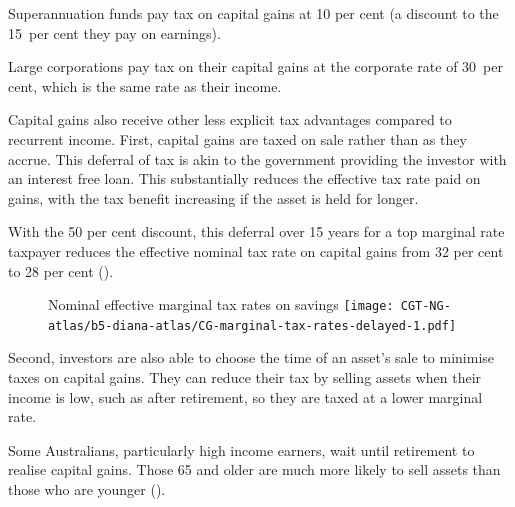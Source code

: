 Superannuation funds pay tax on capital gains at 10 per cent (a discount to the 15~per cent they pay on earnings). 

Large corporations pay tax on their capital gains at the corporate rate of 30~per cent, which is the same rate as their income.

Capital gains also receive other less explicit tax advantages compared to recurrent income. First, capital gains are taxed on sale rather than as they accrue. This deferral of tax is akin to the government providing the investor with an interest free loan.  This substantially reduces the effective tax rate paid on gains, with the tax benefit increasing if the asset is held for longer.


With the 50 per cent discount, this deferral over 15 years for a top marginal rate taxpayer reduces the effective nominal tax rate on capital gains from 32 per cent to 28 per cent ().%

\begin{figure}[!b]
%
{Nominal effective marginal tax rates on savings}\label{fig:CG-marginal-tax-rates-delayed}
\texttt{[image: CGT-NG-atlas/b5-diana-atlas/CG-marginal-tax-rates-delayed-1.pdf]}

\end{figure}


Second, investors are also able to choose the time of an asset's sale to minimise taxes on capital gains. They can reduce their tax by selling assets when their income is low, such as after retirement, so they are taxed at a lower marginal rate. 

Some Australians, particularly high income earners, wait until retirement to realise capital gains. Those 65 and older are much more likely to sell assets than those who are younger ().

\begin{figure}[!b]
\label{fig:CGT-by-age-income}
\vspace{\baselineskip}
\end{figure}

